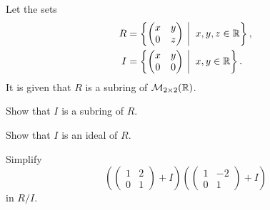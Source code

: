 \begin{exercise}
    Let the sets
    \begin{align*}
        R &= \left\{\begin{pmatrix}x&y\\0&z\end{pmatrix} \vert x,y,z \in \R\right\},\\
        I &= \left\{\begin{pmatrix}x&y\\0&0\end{pmatrix} \vert x,y \in \R\right\}.
    \end{align*}
    It is given that $R$ is a subring of $\mathcal{M}_{2\times2}(\mathbb{R})$.
    \begin{partquestions}{\roman*}
        \item Show that $I$ is a subring of $R$.
        \item Show that $I$ is an ideal of $R$.
        \item Simplify
        \[
            \left(\begin{pmatrix}1&2\\0&1\end{pmatrix} + I\right)\left(\begin{pmatrix}1&-2\\0&1\end{pmatrix} + I\right)
        \]
        in $R/I$.
    \end{partquestions}
\end{exercise}

